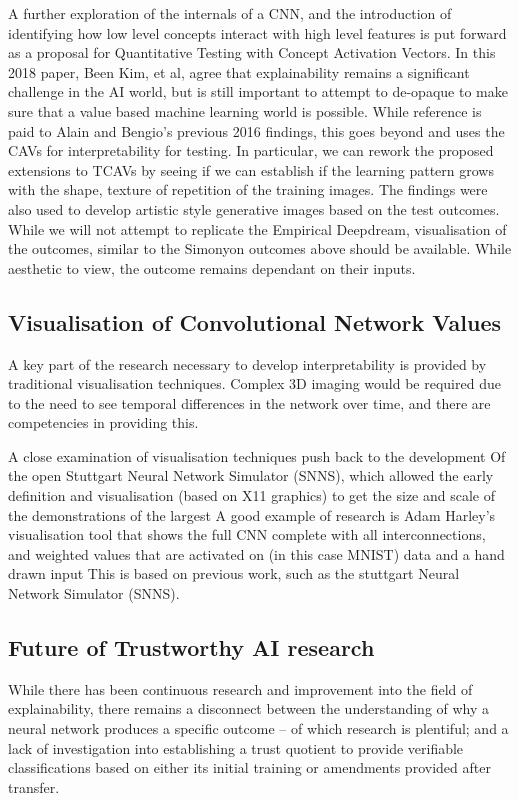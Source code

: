 A further exploration of the internals of a CNN, and the introduction of identifying how low level concepts interact with high level features is put forward as a proposal for Quantitative Testing with Concept Activation Vectors\cite{kimInterpretabilityFeatureAttribution2018}. In this 2018 paper, Been Kim, et al, agree that explainability remains a significant challenge in the AI world, but is still important to attempt to de-opaque to make sure that a value based machine learning world is possible. While reference is paid to Alain and Bengio’s previous 2016 findings, this goes beyond and uses the CAVs for interpretability for testing. In particular, we can rework the proposed extensions to TCAVs by seeing if we can establish if the learning pattern grows with the shape, texture of repetition of the training images.  The findings were also used to develop artistic style generative images based on the test outcomes. While we will not attempt to replicate the Empirical Deepdream, visualisation of the outcomes, similar to the Simonyon outcomes above should be available. While aesthetic to view, the outcome remains dependant on their inputs.

\subsection{Visualisation of Convolutional Network Values}
A key part of the research necessary to develop interpretability is provided by traditional visualisation techniques. Complex 3D imaging would be required due to the need to see temporal differences in the network over time, and there are competencies in providing this.

 A close examination of visualisation techniques push back to the development Of the open Stuttgart Neural Network Simulator (SNNS), which allowed the early definition and visualisation (based on X11 graphics) to get the size and scale of the demonstrations of the largest A good example of research is Adam Harley's visualisation tool\cite{bebisAdvancesVisualComputing2015} that shows the full CNN complete with all interconnections, and weighted values that are activated on (in this case MNIST) data and a hand drawn input This is based on previous work, such as the stuttgart Neural Network Simulator (SNNS).

\subsection{Future of Trustworthy AI research}
While there has been continuous research and improvement into the field of explainability, there remains a disconnect between the understanding of why a neural network produces a specific outcome – of which research is plentiful; and a lack of investigation into establishing a trust quotient to provide verifiable classifications based on either its initial training or amendments provided after transfer.

